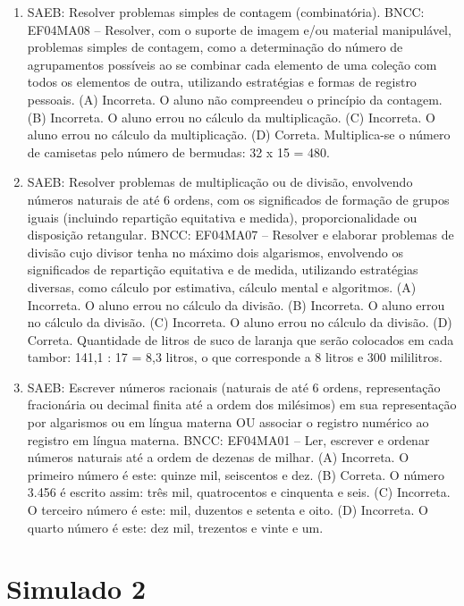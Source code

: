 \begin{enumerate}
\item
SAEB: Resolver problemas simples de contagem (combinatória).
BNCC: EF04MA08 -- Resolver, com o suporte de imagem e/ou material manipulável, problemas simples
de contagem, como a determinação do número de agrupamentos possíveis ao se combinar cada
elemento de uma coleção com todos os elementos de outra, utilizando estratégias e formas de
registro pessoais.
(A) Incorreta. O aluno não compreendeu o princípio da contagem.
(B) Incorreta. O aluno errou no cálculo da multiplicação.
(C) Incorreta. O aluno errou no cálculo da multiplicação.
(D) Correta. Multiplica-se o número de camisetas pelo número de bermudas: 32 x 15 = 480.

\item
SAEB: Resolver problemas de multiplicação ou de divisão,
envolvendo números naturais de até 6 ordens, com os significados de
formação de grupos iguais (incluindo repartição equitativa e medida),
proporcionalidade ou disposição retangular.
BNCC: EF04MA07 -- Resolver e elaborar problemas de divisão cujo divisor tenha no máximo dois algarismos,
envolvendo os significados de repartição equitativa e de medida, utilizando estratégias diversas,
como cálculo por estimativa, cálculo mental e algoritmos.
(A) Incorreta. O aluno errou no cálculo da divisão.
(B) Incorreta. O aluno errou no cálculo da divisão.
(C) Incorreta. O aluno errou no cálculo da divisão.
(D) Correta. Quantidade de litros de suco de laranja que serão colocados em cada
tambor: 141,1 : 17 = 8,3 litros, o que corresponde a 8 litros e 300 mililitros.

\item
SAEB: Escrever números racionais (naturais de até 6 ordens, representação
fracionária ou decimal finita até a ordem dos milésimos) em sua
representação por algarismos ou em língua materna OU associar o registro
numérico ao registro em língua materna.
BNCC: EF04MA01 -- Ler, escrever e ordenar números naturais até a ordem de dezenas de milhar.
(A) Incorreta. O primeiro número é este: quinze mil, seiscentos e dez.
(B) Correta. O número 3.456 é escrito assim: três mil, quatrocentos e cinquenta e seis.
(C) Incorreta. O terceiro número é este: mil, duzentos e setenta e oito.
(D) Incorreta. O quarto número é este: dez mil, trezentos e vinte e um.
\end{enumerate}


\section*{Simulado 2}

